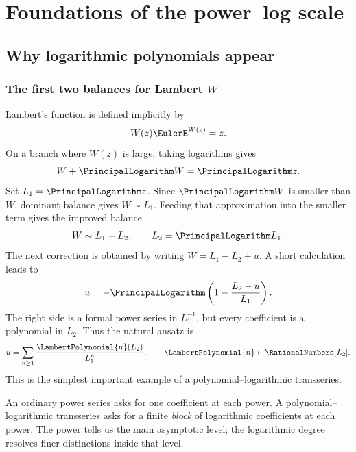 \documentclass[11pt,openany]{book}
\theoremstyle{definition}
\theoremstyle{plain}
\theoremstyle{remark}
\begin{document}
\tableofcontents
\listoftables
\mainmatter

\part{Foundations of the power--log scale}\label{part:foundations}

\chapter{Why logarithmic polynomials appear}\label{ch:why}

\section{The first two balances for Lambert \texorpdfstring{\(W\)}{W}}
Lambert's function is defined implicitly by
\begin{equation}\label{eq:Wdef-preview}
 W(z)\EulerE^{W(z)}=z.
\end{equation}
On a branch where \(W(z)\) is large, taking logarithms gives
\begin{equation}\label{eq:Wlog-preview}
 W+\PrincipalLogarithm W=\PrincipalLogarithm z.
\end{equation}
Set \(L_1=\PrincipalLogarithm z\). Since \(\PrincipalLogarithm W\) is smaller than \(W\), dominant balance gives \(W\sim L_1\). Feeding that approximation into the smaller term gives the improved balance
\[
 W\sim L_1-L_2,
 \qquad L_2=\PrincipalLogarithm L_1.
\]
The next correction is obtained by writing \(W=L_1-L_2+u\). A short calculation leads to
\begin{equation}\label{eq:preview-fixed}
 u=-\PrincipalLogarithm\left(1-\frac{L_2-u}{L_1}\right).
\end{equation}
The right side is a formal power series in \(L_1^{-1}\), but every coefficient is a polynomial in \(L_2\). Thus the natural ansatz is
\begin{equation}\label{eq:preview-ansatz}
 u=\sum_{n\ge1}\frac{\LambertPolynomial{n}(L_2)}{L_1^n},
 \qquad \LambertPolynomial{n}\in\RationalNumbers[L_2].
\end{equation}
This is the simplest important example of a polynomial--logarithmic transseries.

\begin{intuitionbox}
An ordinary power series asks for one coefficient at each power. A polynomial--logarithmic transseries asks for a finite \emph{block} of logarithmic coefficients at each power. The power tells us the main asymptotic level; the logarithmic degree resolves finer distinctions inside that level.
\end{intuitionbox}
\end{document}

